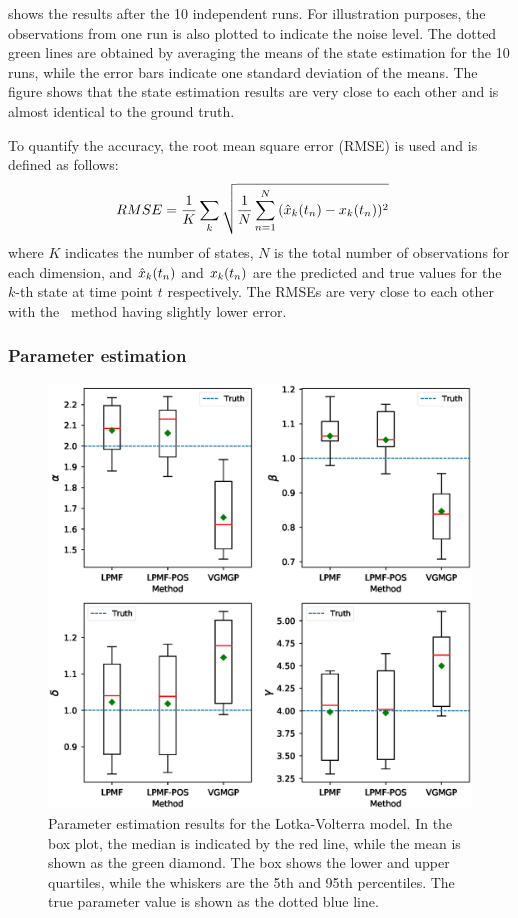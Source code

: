  shows the results after the 10 independent runs.
For illustration purposes, the observations from one run is also plotted to indicate the noise level.
The dotted green lines are obtained by averaging the means of the state estimation for the 10 runs, while the error bars indicate one standard deviation of the means.
The figure shows that the state estimation results are very close to each other and is almost identical to the ground truth.

To quantify the accuracy, the root mean square error (RMSE) is used and is defined as follows:
\begin{align}
    RMSE
    & = \frac{1}{K}\sum_{k}{\sqrt{
        \frac{1}{N}\sum_{n=1}^N{
            (\hat{x}_{k}(t_{n}) - x_{k}(t_{n}))^2
        }
    }}    
\end{align}
where $K$ indicates the number of states, $N$ is the total number of observations for each dimension, and $\hat{x}_{k}(t_{n})$ and $x_{k}(t_{n})$ are the predicted and true values for the $k$-th state at time point $t$ respectively.
The RMSEs are very close to each other with the \algolpmf\ method having slightly lower error.

\subsubsection*{Parameter estimation}

\begin{figure}
    \centering
    \includegraphics[width=1\textwidth]{graphics/lotka-parameters-boxplot}
    \caption{Parameter estimation results for the Lotka-Volterra model. In the box plot, the median is indicated by the red line, while the mean is shown as the green diamond. The box shows the lower and upper quartiles, while the whiskers are the 5th and 95th percentiles. The true parameter value is shown as the dotted blue line.}
    \label{fig-lotka-parameters-boxplot}
\end{figure}

